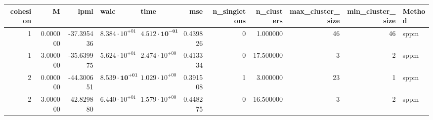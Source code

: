 \begin{tabular}{rrrllrrrrrl}
\toprule
cohesion & M & lpml & waic & time & mse & n_singletons & n_clusters & max_cluster_size & min_cluster_size & Method \\
\midrule
1 & 0.000000 & -37.395436 & $8.384 \cdot 10^{+01}$ & $\mathbf{4.512 \cdot 10^{-01}}$ & 0.439826 & 0 & 1.000000 & 46 & 46 & sppm \\
1 & 3.000000 & -35.639975 & $5.624 \cdot 10^{+01}$ & $2.474 \cdot 10^{+00}$ & 0.413334 & 0 & 17.500000 & 3 & 2 & sppm \\
2 & 0.000000 & -44.300651 & $\mathbf{8.539 \cdot 10^{+01}}$ & $1.029 \cdot 10^{+00}$ & 0.391508 & 1 & 3.000000 & 23 & 1 & sppm \\
2 & 3.000000 & -42.829880 & $6.440 \cdot 10^{+01}$ & $1.579 \cdot 10^{+00}$ & 0.448275 & 0 & 16.500000 & 3 & 2 & sppm \\
\bottomrule
\end{tabular}
